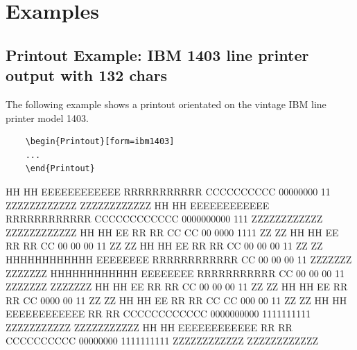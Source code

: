 \documentclass[
11pt,
a4paper,
oneside
]{scrbook}
\begin{document}
{\section{Examples}
\subsection{Printout Example: IBM 1403 line printer output with 132 chars}
\begin{MarginFigure}
	\label{fig:mdlayout-tixi-mainframe-color}
\end{MarginFigure}
The following example shows a printout orientated on the vintage IBM line printer model 1403.
\begin{verbatim}
	\begin{Printout}[form=ibm1403]	
	...
	\end{Printout}
\end{verbatim}
\vspace{2ex}
\begin{Printout}[
	form=ibm1403,
	paperheight=60,
	bandlines=3,
	feedlines=3,
	fitcolumns=132,
	linenumbers=true,
	punchholes=true,
	fontsize=\scriptsize
	]
HH        HH  EEEEEEEEEEEE  RRRRRRRRRRR    CCCCCCCCCC     00000000         11       ZZZZZZZZZZZZ  ZZZZZZZZZZZZ
HH        HH  EEEEEEEEEEEE  RRRRRRRRRRRR  CCCCCCCCCCCC   0000000000       111       ZZZZZZZZZZZZ  ZZZZZZZZZZZZ 
HH        HH  EE            RR        RR  CC        CC  00      0000     1111                ZZ            ZZ   
HH        HH  EE            RR        RR  CC            00     00 00       11               ZZ            ZZ     
HH        HH  EE            RR        RR  CC            00    00  00       11              ZZ            ZZ       
HHHHHHHHHHHH  EEEEEEEE      RRRRRRRRRRRR  CC            00   00   00       11          ZZZZZZZ       ZZZZZZZ       
HHHHHHHHHHHH  EEEEEEEE      RRRRRRRRRRR   CC            00  00    00       11          ZZZZZZZ       ZZZZZZZ        
HH        HH  EE            RR    RR      CC            00 00     00       11           ZZ            ZZ             
HH        HH  EE            RR     RR     CC            0000      00       11          ZZ            ZZ               
HH        HH  EE            RR      RR    CC        CC  000       00       11         ZZ            ZZ                 
HH        HH  EEEEEEEEEEEE  RR       RR   CCCCCCCCCCCC   0000000000    1111111111    ZZZZZZZZZZZ   ZZZZZZZZZZZ          
HH        HH  EEEEEEEEEEEE  RR        RR   CCCCCCCCCC     00000000     1111111111   ZZZZZZZZZZZZ  ZZZZZZZZZZZZ           




\end{Printout}}
\end{document}
